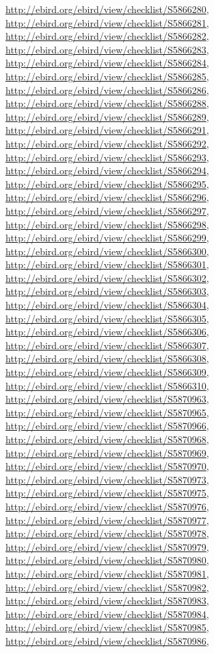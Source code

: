 \documentclass[9pt, article]{memoir}
\begin{document}
\begin{multicols}{2}
\url{http://ebird.org/ebird/view/checklist/S5866280}, 
\url{http://ebird.org/ebird/view/checklist/S5866281}, 
\url{http://ebird.org/ebird/view/checklist/S5866282}, 
\url{http://ebird.org/ebird/view/checklist/S5866283}, 
\url{http://ebird.org/ebird/view/checklist/S5866284}, 
\url{http://ebird.org/ebird/view/checklist/S5866285}, 
\url{http://ebird.org/ebird/view/checklist/S5866286}, 
\url{http://ebird.org/ebird/view/checklist/S5866288}, 
\url{http://ebird.org/ebird/view/checklist/S5866289}, 
\url{http://ebird.org/ebird/view/checklist/S5866291}, 
\url{http://ebird.org/ebird/view/checklist/S5866292}, 
\url{http://ebird.org/ebird/view/checklist/S5866293}, 
\url{http://ebird.org/ebird/view/checklist/S5866294}, 
\url{http://ebird.org/ebird/view/checklist/S5866295}, 
\url{http://ebird.org/ebird/view/checklist/S5866296}, 
\url{http://ebird.org/ebird/view/checklist/S5866297}, 
\url{http://ebird.org/ebird/view/checklist/S5866298}, 
\url{http://ebird.org/ebird/view/checklist/S5866299}, 
\url{http://ebird.org/ebird/view/checklist/S5866300}, 
\url{http://ebird.org/ebird/view/checklist/S5866301}, 
\url{http://ebird.org/ebird/view/checklist/S5866302}, 
\url{http://ebird.org/ebird/view/checklist/S5866303}, 
\url{http://ebird.org/ebird/view/checklist/S5866304}, 
\url{http://ebird.org/ebird/view/checklist/S5866305}, 
\url{http://ebird.org/ebird/view/checklist/S5866306}, 
\url{http://ebird.org/ebird/view/checklist/S5866307}, 
\url{http://ebird.org/ebird/view/checklist/S5866308}, 
\url{http://ebird.org/ebird/view/checklist/S5866309}, 
\url{http://ebird.org/ebird/view/checklist/S5866310}, 
\url{http://ebird.org/ebird/view/checklist/S5870963}, 
\url{http://ebird.org/ebird/view/checklist/S5870965}, 
\url{http://ebird.org/ebird/view/checklist/S5870966}, 
\url{http://ebird.org/ebird/view/checklist/S5870968}, 
\url{http://ebird.org/ebird/view/checklist/S5870969}, 
\url{http://ebird.org/ebird/view/checklist/S5870970}, 
\url{http://ebird.org/ebird/view/checklist/S5870973}, 
\url{http://ebird.org/ebird/view/checklist/S5870975}, 
\url{http://ebird.org/ebird/view/checklist/S5870976}, 
\url{http://ebird.org/ebird/view/checklist/S5870977}, 
\url{http://ebird.org/ebird/view/checklist/S5870978}, 
\url{http://ebird.org/ebird/view/checklist/S5870979}, 
\url{http://ebird.org/ebird/view/checklist/S5870980}, 
\url{http://ebird.org/ebird/view/checklist/S5870981}, 
\url{http://ebird.org/ebird/view/checklist/S5870982}, 
\url{http://ebird.org/ebird/view/checklist/S5870983}, 
\url{http://ebird.org/ebird/view/checklist/S5870984}, 
\url{http://ebird.org/ebird/view/checklist/S5870985}, 
\url{http://ebird.org/ebird/view/checklist/S5870986}, 

\end{multicols}
\end{document}
